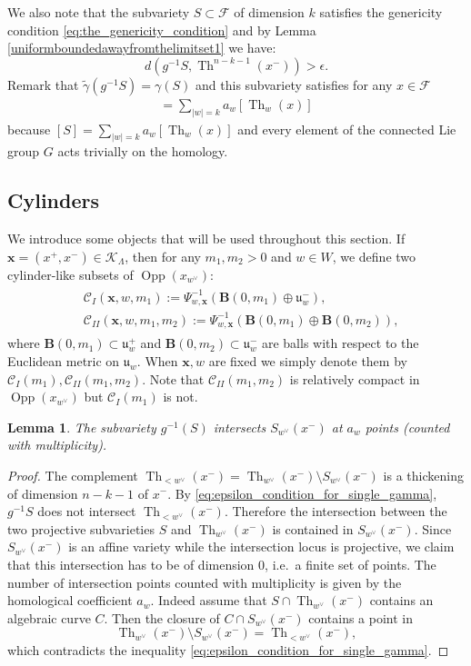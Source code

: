 \documentclass[12pt]{amsbook}%
\newtheorem{lem}[thm]{Lemma}
\theoremstyle{definition}
\theoremstyle{remark}
\numberwithin{section}{chapter}
\numberwithin{subsection}{section}
\numberwithin{figure}{chapter}
\DeclareMathOperator{\Th}{Th}
\def\dyl{>0}
\def\cF{{\mathscr{F}}}
\def\sK{{\mathscr{K}}}
\def\fu{{\mathfrak{u}}}
\def\fuwp{{\mathfrak{u}_w^+}}
\def\fuwm{{\mathfrak{u}_w^-}}
\def\Oppxwd{{\operatorname{Opp}(x_{w^\vee})}}
\def\xpair{{(x^+,x^-)}}
\def\tga{{\tilde{\gamma}}}
\def\Cyli{{\mathcal{C}_I}}
\def\Cylii{{\mathcal{C}_{II}}}
\def\bx{\mathbf{x}}
\def\ga{\gamma}
\begin{document}
{{We also note that the subvariety $S\subset \cF$ of dimension $k$ satisfies the genericity condition \eqref{eq:the_genericity_condition} and by Lemma \ref{uniformboundedawayfromthelimitset1} we have:
\begin{equation}\label{eq:epsilon_condition_for_single_gamma}
d(g^{-1}S,\Th^{{n-k-1}}(x^-))>\epsilon.
\end{equation}
Remark that $\tga(g^{-1}S)=\ga(S)$ and this subvariety satisfies for any $x\in \cF$
\begin{align*}
[\ga(S)]=\sum_{\vert w\vert=k}a_w[\Th_w(x)]
\end{align*}
because $[S]=\sum_{\vert w\vert=k}a_w[\Th_w(x)]$ and every element of the connected Lie group $G$ acts trivially on the homology.

\subsection{Cylinders}
We introduce some objects that will be used throughout this section. If $\bx=\xpair\in \sK_\Lambda$, then for any $m_1,m_2\dyl$ and $w\in W$, we define two cylinder-like subsets of $\Oppxwd$:
\begin{align}\label{eq:definition_cylinder}
\begin{aligned}
& \Cyli(\bx,w,m_1):=\Psi_{w,\bx}^{-1}\left(\mathbf{B}(0,m_1)\oplus \fuwm \right),\\
& \Cylii(\bx,w,m_1,m_2):=\Psi_{w,\bx}^{-1}\left(\mathbf{B}(0,m_1)\oplus \mathbf{B}(0,m_2)\right),
\end{aligned}
\end{align}
where $\mathbf{B}(0,m_1)\subset \fuwp$ and $\mathbf{B}(0,m_2)\subset \fuwm$ are balls with respect to the Euclidean metric on $\fu_w$. When $\bx,w$ are fixed we simply denote them by $\Cyli(m_1), \Cylii(m_1,m_2)$. Note that $\Cylii(m_1,m_2)$ is relatively compact in $\Oppxwd$ but $\Cyli(m_1)$ is not.

\begin{lem}\label{finiteintersectionlemma1}
The subvariety $g^{-1}(S)$ intersects $S_{w^{\vee}}(x^-)$ at $a_w$ points (counted with multiplicity).
\end{lem}
\begin{proof}
The complement $ \Th_{<w^\vee}(x^-)=\Th_{w^\vee}(x^-)\setminus S_{w^\vee}(x^-)$ is a thickening of dimension $n-k-1$ of $x^-$. By \eqref{eq:epsilon_condition_for_single_gamma}, $g^{-1}S$ does not intersect $ \Th_{<w^\vee}(x^-)$. Therefore the intersection between the two projective subvarieties $S$ and $\Th_{w^\vee}(x^-)$ is contained in $S_{w^\vee}(x^-)$. Since $S_{w^\vee}(x^-)$ is an affine variety while the intersection locus is projective, we claim that this intersection has to be of dimension $0$, 
i.e.\ a finite set of points. The number of intersection points counted with multiplicity is given by the homological coefficient $a_w$.
Indeed assume that $S \cap \Th_{w^\vee}(x^-)$ contains an algebraic curve $C$. Then the closure of $C\cap S_{w^\vee}(x^-)  $ contains a point in $$\Th_{w^\vee}(x^-) \setminus S_{w^\vee}(x^-) =  \Th_{<w^\vee}(x^-),$$ 
which contradicts the inequality \eqref{eq:epsilon_condition_for_single_gamma}.
\end{proof}




}}
\end{document}
